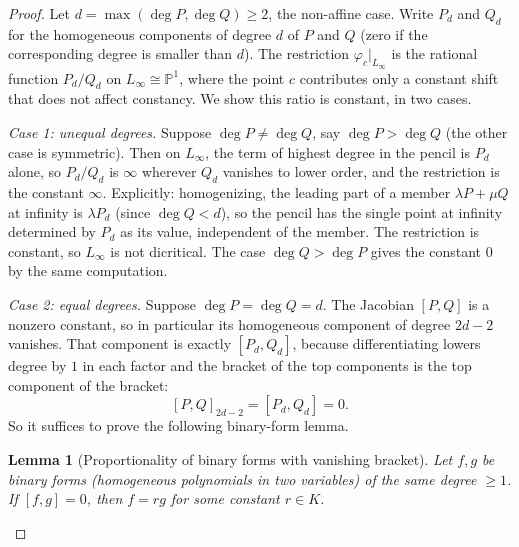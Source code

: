 \documentclass[a4paper,11pt]{article}
\theoremstyle{plain}
\newtheorem{lemma}[theorem]{Lemma}
\theoremstyle{definition}
\theoremstyle{remark}
\begin{document}
\begin{proof}
Let $d = \max(\deg P, \deg Q) \geq 2$, the non-affine case. Write $P_d$ and $Q_d$ for the
homogeneous components of degree $d$ of $P$ and $Q$ (zero if the corresponding degree is
smaller than $d$). The restriction $\varphi_c|_{L_\infty}$ is the rational function
$P_d / Q_d$ on $L_\infty \cong \mathbb{P}^1$, where the point $c$ contributes only a constant
shift that does not affect constancy. We show this ratio is constant, in two cases.

\emph{Case 1: unequal degrees.} Suppose $\deg P \neq \deg Q$, say $\deg P > \deg Q$ (the other
case is symmetric). Then on $L_\infty$, the term of highest degree in the pencil is $P_d$
alone, so $P_d / Q_d$ is $\infty$ wherever $Q_d$ vanishes to lower order, and the restriction
is the constant $\infty$. Explicitly: homogenizing, the leading part of a member
$\lambda P + \mu Q$ at infinity is $\lambda P_d$ (since $\deg Q < d$), so the pencil has the
single point at infinity determined by $P_d$ as its value, independent of the member. The
restriction is constant, so $L_\infty$ is not dicritical. The case $\deg Q > \deg P$ gives
the constant $0$ by the same computation.

\emph{Case 2: equal degrees.} Suppose $\deg P = \deg Q = d$. The Jacobian $[P,Q]$ is a nonzero
constant, so in particular its homogeneous component of degree $2d - 2$ vanishes. That
component is exactly $[P_d, Q_d]$, because differentiating lowers degree by $1$ in each factor
and the bracket of the top components is the top component of the bracket:
\begin{equation}\label{td:eq:top-bracket}
[P,Q]_{2d-2} = [P_d, Q_d] = 0.
\end{equation}
So it suffices to prove the following binary-form lemma.

\begin{lemma}[Proportionality of binary forms with vanishing bracket]\label{td:lem:binary}
Let $f, g$ be binary forms (homogeneous polynomials in two variables) of the same degree
$\geq 1$. If $[f,g] = 0$, then $f = r g$ for some constant $r \in K$.
\end{lemma}


\end{proof}
\end{document}
